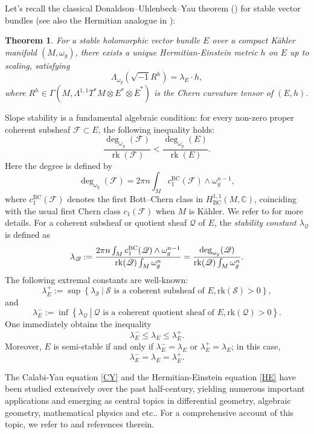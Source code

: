 \documentclass[12pt, reqno]{amsart}
\newcommand\cF{{\mathcal F}}
\newcommand\sQ{{\mathscr Q}}
\newcommand{\rk}{{\rm rk}}
\theoremstyle{plain}
\newtheorem{theorem}{Theorem}[section]
\theoremstyle{definition}
\newcommand{\sq}{\sqrt{-1}}
\renewcommand{\bar}{\overline}
\newcommand{\beq}{\begin{equation}}
\newcommand{\eeq}{\end{equation}}
\newcommand{\ts}{\otimes}
\renewcommand{\>}{\rightarrow}
\renewcommand{\>}{\rightarrow}
\renewcommand{\bar}{\overline}
\numberwithin{equation}{section} %
\begin{document}
Let's recall the classical Donaldson--Uhlenbeck--Yau theorem (\cite{Don85, UY86, Don87}) for stable vector bundles (see also the Hermitian analogue in \cite{LY86}):  \setcounter{theorem}{0}
\renewcommand{\thetheorem}{\Alph{theorem}}\begin{theorem} \label{DUY} For  a stable holomorphic vector bundle $E$ over a compact K\"ahler manifold $(M,\omega_g)$,  there exists a unique Hermitian-Einstein metric $h$ on $E$ up to scaling, satisfying
    \beq \Lambda_{\omega_g} \left(\sq R^h\right)=\lambda_E\cdot h, \label{HE} \eeq
    where $R^h\in\Gamma(M,\Lambda^{1,1}T^*M\ts E^*\ts \bar E^*)$ is the Chern curvature tensor of $(E,h)$. 
 \end{theorem}
\noindent Slope stability is a fundamental algebraic condition:  for every non-zero proper coherent subsheaf $\mathcal{F} \subset E$, the following inequality holds:
\beq 
\frac{\deg_{\omega_g}(\mathcal{F})}{\operatorname{rk}(\mathcal{F})} < \frac{\deg_{\omega_g}(E)}{\operatorname{rk}(E)}.
\label{stable condition}
\eeq 
Here the degree is  defined by
\beq 
\deg_{\omega_g}(\mathcal{F}) = 2\pi n \int_M c^{\mathrm{BC}}_1(\mathcal{F}) \wedge \omega_g^{n-1},
\eeq 
where $c^{\mathrm{BC}}_1(\cF)$ denotes the first Bott--Chern class in $H^{1,1}_{\mathrm{BC}}(M, \mathbb{C})$, coinciding with the usual first Chern class $c_1(\cF)$ when $M$ is K\"ahler. We refer to \cite{Kob87} for more details.  
\noindent For a coherent subsheaf  or quotient sheaf  $\sQ$ of $E$, the \emph{stability constant} $\lambda_\sQ$ is defined as  \beq
\lambda_\sQ:=\frac{2\pi n\int_M c^{\mathrm{BC}}_1(\sQ)\wedge
	\omega_g^{n-1}}{\mathrm{\rk}(\sQ)\int_M\omega_g^n}=\frac{\deg_{\omega_g}(\sQ)}{\rk(\sQ)
	\int_M\omega_g^n}.\eeq 
The following extremal constants are well-known:
 \beq \lambda_E^+ := \sup\left\{ \left. \lambda_\mathscr{S}\ \right|\  \mathscr{S} \text{ is a coherent subsheaf of } E, \mathrm{rk}(\mathscr{S}) > 0 \right\}, \label{lambda+}\eeq
and
  \beq \lambda_E^- := \inf\left\{ \left. \lambda_\sQ\ \right|\  \mathscr{Q} \text{ is a coherent quotient sheaf of } E, \mathrm{rk}(\mathscr{Q}) > 0 \right\}. \label{lambda-}\eeq
One immediately obtains the inequality
\beq \lambda_E^-\leq \lambda_E\leq \lambda_E^+.\eeq 
Moreover, $E$ is semi-stable if and only if $\lambda_E^-=\lambda_E$ or $\lambda_E^+=\lambda_E$; in this case,  \beq  \lambda_E^-= \lambda_E=\lambda_E^+.\eeq

\baselineskip

The Calabi-Yau equation \eqref{CY} and the Hermitian-Einstein equation \eqref{HE} have been studied extensively over the past half-century, yielding numerous important applications and emerging as central topics in  differential geometry, algebraic geometry, mathematical physics and etc.. For a comprehensive account of this topic, we refer to \cite{NS65, Siu87, Sim88, Sim92, Kol98, DW04, FY08, TW10, Jac14, LZ15, CS16, STW17, Sze18, CSW18, Fu19, CS20, DS21, Li21, MPS25} and references therein.\\
\end{document}
